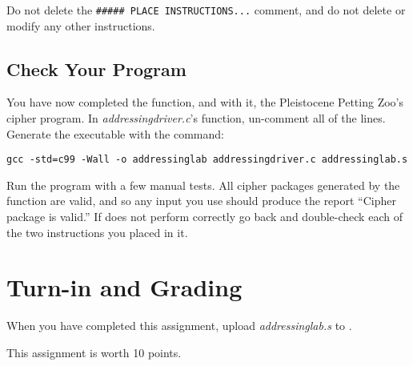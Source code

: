 
Do not delete the \texttt{\#\#\#\#\# PLACE INSTRUCTIONS...} comment, and do not
delete or modify any other instructions.

\subsection*{Check Your Program}

You have now completed the  function, and with it,
the Pleistocene Petting Zoo's cipher program. In \textit{addressingdriver.c}'s
 function, un-comment all of the lines. Generate the executable
with the command:

\texttt{gcc -std=c99 -Wall -o addressinglab addressingdriver.c addressinglab.s}

Run the program with a few manual tests. All cipher packages generated by the
 function are valid, and so any input you use should produce the
report ``Cipher package is valid.'' If  does not
perform correctly go back and double-check each of the two instructions you
placed in it.


\section*{Turn-in and Grading}

When you have completed this assignment, upload \textit{addressinglab.s} to
\filesubmission.

This assignment is worth 10 points. \\

\begin{description}
\end{description}


